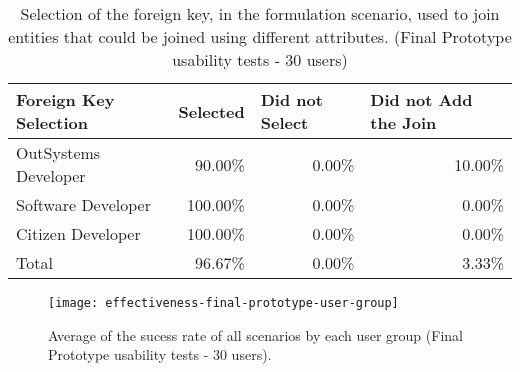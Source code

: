 \begin{table}[tb]
  \caption{Selection of the foreign key, in the formulation scenario, used to join entities that could be joined using different attributes. (Final Prototype usability tests - 30 users)}
    \label{tab:finalPrototypeForeignKeySelection}
  \begin{tabular}{@{}lrrr@{}}
  \toprule
  \textbf{Foreign Key Selection} & \multicolumn{1}{l}{Selected} & \multicolumn{1}{l}{Did not Select} & \multicolumn{1}{l}{Did not Add the Join} \\ \midrule
  OutSystems Developer           & 90.00\%                      & 0.00\%                             & 10.00\%                                  \\
  Software Developer             & 100.00\%                     & 0.00\%                             & 0.00\%                                   \\
  Citizen Developer              & 100.00\%                     & 0.00\%                             & 0.00\%                                   \\
  Total                          & 96.67\%                      & 0.00\%                             & 3.33\%                                   \\ \bottomrule
  \end{tabular}
  \end{table}

\begin{figure}[htbp]
	\centering
	\texttt{[image: effectiveness-final-prototype-user-group]}
	\caption{Average of the sucess rate of all scenarios by each user group (Final Prototype usability tests - 30 users).}
	\label{fig:effectivenessFinalPrototypeUserGroup}
\end{figure}

